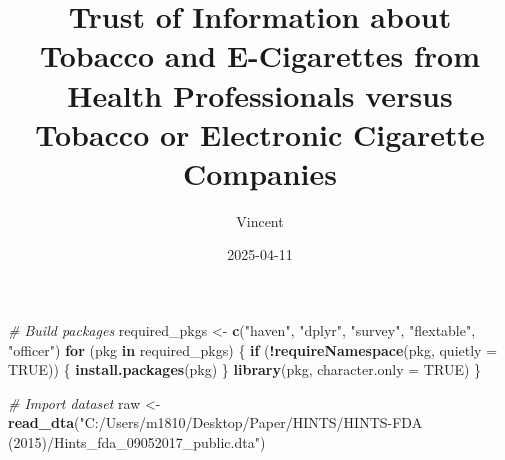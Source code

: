 \documentclass[
]{article}
\title{Trust of Information about Tobacco and E-Cigarettes from Health
Professionals versus Tobacco or Electronic Cigarette Companies}
\author{Vincent}
\date{2025-04-11}
\newenvironment{Shaded}{\begin{snugshade}}{\end{snugshade}}
\newcommand{\AttributeTok}[1]{\textcolor[rgb]{0.13,0.29,0.53}{#1}}
\newcommand{\CommentTok}[1]{\textcolor[rgb]{0.56,0.35,0.01}{\textit{#1}}}
\newcommand{\ConstantTok}[1]{\textcolor[rgb]{0.56,0.35,0.01}{#1}}
\newcommand{\ControlFlowTok}[1]{\textcolor[rgb]{0.13,0.29,0.53}{\textbf{#1}}}
\newcommand{\FunctionTok}[1]{\textcolor[rgb]{0.13,0.29,0.53}{\textbf{#1}}}
\newcommand{\NormalTok}[1]{#1}
\newcommand{\OtherTok}[1]{\textcolor[rgb]{0.56,0.35,0.01}{#1}}
\newcommand{\SpecialCharTok}[1]{\textcolor[rgb]{0.81,0.36,0.00}{\textbf{#1}}}
\newcommand{\StringTok}[1]{\textcolor[rgb]{0.31,0.60,0.02}{#1}}
\begin{document}
\maketitle

\begin{Shaded}
\begin{Highlighting}[]
\CommentTok{\# Build packages}
\NormalTok{required\_pkgs }\OtherTok{\textless{}{-}} \FunctionTok{c}\NormalTok{(}\StringTok{"haven"}\NormalTok{, }\StringTok{"dplyr"}\NormalTok{, }\StringTok{"survey"}\NormalTok{, }\StringTok{"flextable"}\NormalTok{, }\StringTok{"officer"}\NormalTok{)}
\ControlFlowTok{for}\NormalTok{ (pkg }\ControlFlowTok{in}\NormalTok{ required\_pkgs) \{}
  \ControlFlowTok{if}\NormalTok{ (}\SpecialCharTok{!}\FunctionTok{requireNamespace}\NormalTok{(pkg, }\AttributeTok{quietly =} \ConstantTok{TRUE}\NormalTok{)) \{}
    \FunctionTok{install.packages}\NormalTok{(pkg)}
\NormalTok{  \}}
  \FunctionTok{library}\NormalTok{(pkg, }\AttributeTok{character.only =} \ConstantTok{TRUE}\NormalTok{)}
\NormalTok{\}}

\CommentTok{\# Import dataset}
\NormalTok{raw }\OtherTok{\textless{}{-}} \FunctionTok{read\_dta}\NormalTok{(}\StringTok{"C:/Users/m1810/Desktop/Paper/HINTS/HINTS{-}FDA (2015)/Hints\_fda\_09052017\_public.dta"}\NormalTok{)}
\end{Highlighting}
\end{Shaded}
\end{document}
